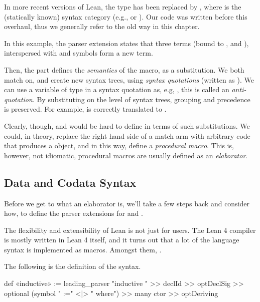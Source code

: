 \begin{remark}
    In more recent versions of Lean, the  type has been replaced by , where  is the (statically known) syntax category (e.g.,  or ).
    Our code was written before this overhaul, thus we generally refer to the old way in this chapter.
\end{remark}


In this example, the parser extension states that three terms (bound to ,  and ), interspersed with  and \lean{:} symbols form a new term.

Then, the 
part defines the \emph{semantics} of the macro, as a substitution. We both match on, and create new syntax trees, using \emph{syntax quotations} (written as ). We can use a variable of type  in a syntax quotation as, e.g, , this is called an \emph{anti-quotation}. By substituting on the level of syntax trees, grouping and precedence is preserved. For example,  is correctly translated
to .

Clearly, though, \data{} and \codata{} would be hard to define in terms of such substitutions.
We could, in theory, replace the right hand side of a  match arm 
with arbitrary code that produces a  object, and in this way, define a \emph{procedural macro}.
This is, however, not idiomatic, procedural macros are usually defined as an \emph{elaborator}.


\subsection*{Data and Codata Syntax}%
\label{subsec:impl:syntax}

Before we get to what an elaborator is, we'll take a few steps back and consider how, to define the parser extensions for \data{} and \codata{}.

The flexibility and extensibility of Lean is not just for users. The Lean 4 compiler is mostly written in Lean 4 itself, and it turns out that a lot of the language syntax is implemented as macros. Amongst them, \inductive{}.

The following is the definition of the \inductive{} syntax.
\begin{leancode}
  def «inductive» := leading_parser "inductive " >> declId >> optDeclSig 
                      >> optional (symbol " :=" <|> " where") 
                      >> many ctor 
                      >> optDeriving
\end{leancode}

